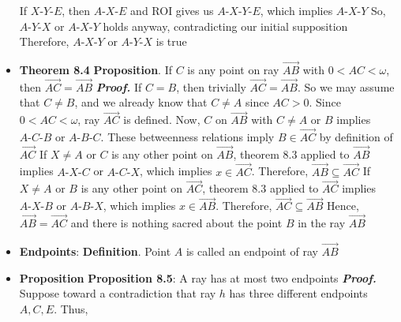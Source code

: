 \documentclass{report}
\begin{document}
\begin{itemize}
            \bigbreak \noindent 
            If $ X\text{-}Y\text{-}E$, then $ A\text{-}X\text{-}E $ and ROI gives us $ A\text{-}X\text{-}Y\text{-}E$, which implies $ A\text{-}X\text{-}Y $
            \bigbreak \noindent 
            So, $ A\text{-}Y\text{-}X$ or $ A\text{-}X\text{-}Y$ holds anyway, contradicting our initial supposition
            \bigbreak \noindent 
            Therefore, $ A\text{-}X\text{-}Y$ or $ A\text{-}Y\text{-}X$ is true \endpf
        \item \textbf{Theorem 8.4}
            \bigbreak \noindent 
            \textbf{Proposition}. If $C$ is any point on ray $ \overrightarrow{AB}$ with $ 0 < AC < \omega$, then $ \overrightarrow{AC} = \overrightarrow{AB} $
            \bigbreak \noindent 
            \textbf{\textit{Proof.}} If $C = B$, then trivially $ \overrightarrow{AC}  = \overrightarrow{AB}$. So we may assume that $ C \ne B$, and we already know that $C \ne A$ since $ AC > 0$. Since $0 < AC < \omega$, ray $ \overrightarrow{AC} $ is defined.
            \bigbreak \noindent 
            Now, $C$ on $\overrightarrow{AB}$ with $ C \ne A$ or $B$ implies $ A\text{-}C\text{-}B$ or $ A\text{-}B\text{-}C$. These betweenness relations imply $ B \in \overrightarrow{AC}$ by definition of $\overrightarrow{AC} $
            \bigbreak \noindent 
            If $X\ne A$ or $C$ is any other point on $\overrightarrow{AB}$, theorem 8.3 applied to $ \overrightarrow{AB}$ implies $ A\text{-}X\text{-}C $ or $ A\text{-}C\text{-}X$, which implies $ x \in \overrightarrow{AC}$. Therefore, $\overrightarrow{AB} \subseteq \overrightarrow{AC}$
            \bigbreak \noindent 
            If $X\ne A$ or $B$ is any other point on $\overrightarrow{AC}$, theorem 8.3 applied to $\overrightarrow{AC}$ implies $ A\text{-}X\text{-}B$ or $ A\text{-}B\text{-}X$, which implies $x\in \overrightarrow{AB} $. Therefore, $\overrightarrow{AC} \subseteq \overrightarrow{AB}$
            \bigbreak \noindent 
            Hence, $\overrightarrow{AB} = \overrightarrow{AC} $ and there is nothing sacred about the point $B$ in the ray $\overrightarrow{AB}$ \endpf
        \item \textbf{Endpoints}: 
            \bigbreak \noindent 
            \textbf{Definition}. Point $A$ is called an endpoint of ray $\overrightarrow{AB} $
        \item \textbf{Proposition}
            \bigbreak \noindent 
            \textbf{Proposition 8.5}: A ray has at most two endpoints
            \bigbreak \noindent 
            \textbf{\textit{Proof.}} Suppose toward a contradiction that ray $h$ has three different endpoints $A,C,E$. Thus,

\end{itemize}
\end{document}
